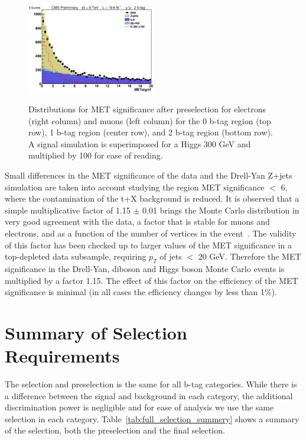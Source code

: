 \begin{figure}[htb!]
{    \includegraphics[width=0.5\textwidth]{presentation/defense/images/preselection/2/mu/METsignif.eps}
  }
  \caption{
    Distributions for MET significance after preselection for electrons (right column) and muons (left column) for the 0 b-tag region (top row), 1 b-tag region (center row), and 2 b-tag region (bottom row).  A signal simulation is superimposed for a Higgs 300 GeV and multiplied by 100 for ease of reading.
  }
  \label{fig:metsignificance}
\end{figure}


Small differences in the MET significance of the data and the Drell-Yan Z+jets simulation are taken into account studying the region MET significance $<$ 6, where the contamination of the t+X background is reduced. It is observed that a simple multiplicative factor of 1.15 $\pm$ 0.01 brings the Monte Carlo distribution in very good agreement with the data, a factor that is stable for muons and electrons, and as a function of the number of vertices in the event~\cite{CMS-AN-HIG-13-064}. The validity of this factor has been checked up to larger values of the MET significance in a top-depleted data subsample, requiring $p_T$ of jets $<$ 20 GeV. Therefore the MET significance in the Drell-Yan, diboson and Higgs boson Monte Carlo events is multiplied by a factor 1.15. The effect of this factor on the efficiency of the MET significance is minimal (in all cases the efficiency changes by less than 1\%).



\section{Summary of Selection Requirements}
\label{sec:summaryofselectionrequirements}

The selection and preselection is the same for all b-tag categories. While there is a difference between the signal and background in each category, the additional discrimination power is negligible and for ease of analysis we use the same selection in each category.  Table~\ref{tab:full_selection_summery} shows a summary of the selection, both the preselection and the final selection.  

